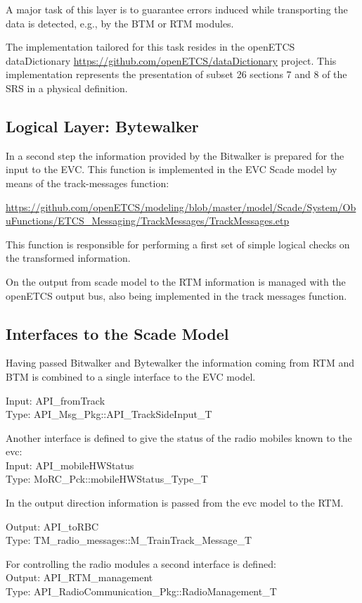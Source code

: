 \documentclass{template/openetcs_report}
\begin{document}
A major task of this layer is to guarantee errors induced while transporting the data is detected, e.g., by the BTM or RTM modules.

The implementation tailored for this task resides in the openETCS dataDictionary \url{https://github.com/openETCS/dataDictionary} project. This implementation represents the presentation of subset 26 sections 7 and 8 of the SRS in a physical definition.

\subsection{Logical Layer: Bytewalker}

In a second step the information provided by the Bitwalker is prepared for the input to the EVC. This function is implemented in the EVC Scade model by means of the track-messages function:

\url{https://github.com/openETCS/modeling/blob/master/model/Scade/System/ObuFunctions/ETCS_Messaging/TrackMessages/TrackMessages.etp}

This function is responsible for performing a first set of simple logical checks on the transformed information.

On the output from scade model to the RTM information is managed with the openETCS output bus, also being implemented in the track messages function.

\subsection{Interfaces to the Scade Model}

Having passed Bitwalker and Bytewalker the information coming from RTM and BTM is combined to a single interface to the EVC model.

Input: API\_fromTrack\\
Type: API\_Msg\_Pkg::API\_TrackSideInput\_T

Another interface is defined to give the status of the radio mobiles known to the evc:\\
Input: API\_mobileHWStatus\\
Type: MoRC\_Pck::mobileHWStatus\_Type\_T

In the output direction information is passed from the evc model to the RTM.

Output: API\_toRBC\\
Type: TM\_radio\_messages::M\_TrainTrack\_Message\_T

For controlling the radio modules a second interface is defined:\\
Output: API\_RTM\_management\\
Type: API\_RadioCommunication\_Pkg::RadioManagement\_T
\end{document}
